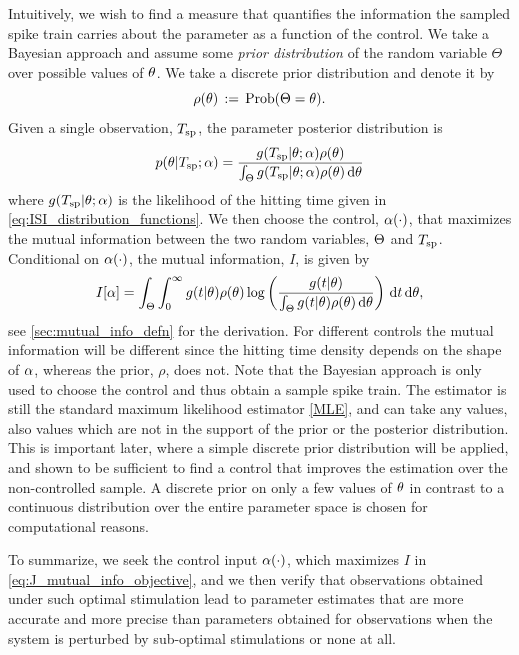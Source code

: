 \documentclass{article}
\begin{document}
Intuitively, we wish to find a measure that quantifies the information
the sampled spike train carries about the parameter as a function of
the control. We take a Bayesian approach and assume some {\sl  prior
  distribution} of the random variable $\Theta$ over
possible values of ${\theta}$. We take a discrete prior distribution
and denote it by
$$
\rho({\theta}) \, := \,  \operatorname{Prob}(\Theta = {\theta})  . 
$$
Given a single observation, ${ T_{\textrm{sp} } }$, the parameter posterior 
distribution is 
\begin{equation}
p({\theta}| { T_{\textrm{sp} } }; {\alpha}) =
\frac{g({ T_{\textrm{sp} } } |{\theta}; {\alpha}) \rho({\theta})}{\int_\Theta g({ T_{\textrm{sp} } }|{\theta}; {\alpha}) \rho({\theta})
\, \mathrm{d} {\theta}}
\label{eq:parameter_posterior_defn}
\end{equation} 
where $ g( { T_{\textrm{sp} } } |{\theta}; {\alpha})$ is the likelihood of the hitting time given in
\cref{eq:ISI_distribution_functions}. We then choose the control,
${\alpha}(\cdot)$, that maximizes the mutual 
information  between the two random variables, ${\Theta}$ and ${ T_{\textrm{sp} } }$. Conditional on
${\alpha}(\cdot)$, the mutual information, $I$, is given by
\begin{equation}
I[{\alpha}]= 
\int_\Theta \int_0^\infty g(t|{\theta})\rho({\theta})  
\log \left( \frac{g(t|{\theta})}
{\int_\Theta g(t|{\theta})\rho({\theta}) \, \mathrm{d} {\theta}   } \right)
\, \mathrm{d} t\, \mathrm{d} {\theta},
\label{eq:J_mutual_info_objective}
\end{equation}
see \cref{sec:mutual_info_defn} for the derivation. For different controls
the mutual information will be different since the hitting time
density depends on the shape of ${\alpha}$, whereas the prior, $\rho$, does
not. Note that the Bayesian approach is only used to choose the
control and thus obtain a sample spike train. The estimator is still the
standard maximum likelihood estimator \cref{MLE}, and can take any
values, also values which are not in the support of the prior or the
posterior distribution. This is
important later, where a simple discrete prior distribution will be
applied, and shown to be sufficient to find a control that improves
the estimation over the non-controlled sample. A discrete prior on
only a few values of ${\theta}$ in contrast to a continuous distribution
over the entire parameter space is chosen for computational reasons. 
  
To summarize, we seek the control input ${\alpha}(\cdot)$, which maximizes $I$ in
\cref{eq:J_mutual_info_objective}, and we then verify that observations obtained
under such optimal stimulation lead to parameter estimates that are more
accurate and more precise than parameters obtained for observations when the
system is perturbed by sub-optimal stimulations or none at all.
\end{document}
